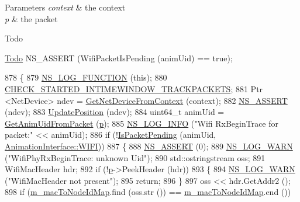 \begin{DoxyParams}{Parameters}
{\em context} & the context \\
\hline
{\em p} & the packet \\
\hline
\end{DoxyParams}
\begin{DoxyRefDesc}{Todo}
\item[\hyperlink{todo__todo000140}{Todo}]N\+S\+\_\+\+A\+S\+S\+E\+RT (Wifi\+Packet\+Is\+Pending (anim\+Uid) == true); \end{DoxyRefDesc}

\begin{DoxyCode}
878 \{
879   \hyperlink{log-macros-disabled_8h_a90b90d5bad1f39cb1b64923ea94c0761}{NS\_LOG\_FUNCTION} (\textcolor{keyword}{this});
880   \hyperlink{animation-interface_8h_acdf351a3155a6ccf1813189e10dba8f5}{CHECK\_STARTED\_INTIMEWINDOW\_TRACKPACKETS};
881   Ptr <NetDevice> ndev = \hyperlink{classns3_1_1AnimationInterface_a5054e94f0c5e3d0a4443cfbe52e2ea30}{GetNetDeviceFromContext} (context);
882   \hyperlink{assert_8h_a6dccdb0de9b252f60088ce281c49d052}{NS\_ASSERT} (ndev);
883   \hyperlink{classns3_1_1AnimationInterface_ab751cf6f459289f0978f4bb97b93044d}{UpdatePosition} (ndev);
884   uint64\_t animUid = \hyperlink{classns3_1_1AnimationInterface_a18e6a184ccd7dee800bf734f8adc818c}{GetAnimUidFromPacket} (\hyperlink{lte__link__budget_8m_ac9de518908a968428863f829398a4e62}{p});
885   \hyperlink{group__logging_gafbd73ee2cf9f26b319f49086d8e860fb}{NS\_LOG\_INFO} (\textcolor{stringliteral}{"Wifi RxBeginTrace for packet:"} << animUid);
886   \textcolor{keywordflow}{if} (!\hyperlink{classns3_1_1AnimationInterface_a0bee27aa30e136d5035050ec2ef0012d}{IsPacketPending} (animUid, \hyperlink{classns3_1_1AnimationInterface_a801a4efd553ff0d1d768cd70d22456b6afc37c88b12f1b26ee565dac2536d0bb5}{AnimationInterface::WIFI}))
887     \{
888       \hyperlink{assert_8h_a6dccdb0de9b252f60088ce281c49d052}{NS\_ASSERT} (0);
889       \hyperlink{group__logging_gade7208b4009cdf0e25783cd26766f559}{NS\_LOG\_WARN} (\textcolor{stringliteral}{"WifiPhyRxBeginTrace: unknown Uid"});
890       std::ostringstream oss;
891       WifiMacHeader hdr;
892       \textcolor{keywordflow}{if} (!\hyperlink{lte__link__budget_8m_ac9de518908a968428863f829398a4e62}{p}->PeekHeader (hdr))
893       \{ 
894         \hyperlink{group__logging_gade7208b4009cdf0e25783cd26766f559}{NS\_LOG\_WARN} (\textcolor{stringliteral}{"WifiMacHeader not present"});
895         \textcolor{keywordflow}{return};
896       \}
897       oss << hdr.GetAddr2 ();
898       \textcolor{keywordflow}{if} (\hyperlink{classns3_1_1AnimationInterface_a4d47d5b16cac7965cc0fbb1c50b3a268}{m\_macToNodeIdMap}.find (oss.str ()) == \hyperlink{classns3_1_1AnimationInterface_a4d47d5b16cac7965cc0fbb1c50b3a268}{m\_macToNodeIdMap}.end ()) 

\end{DoxyCode}
